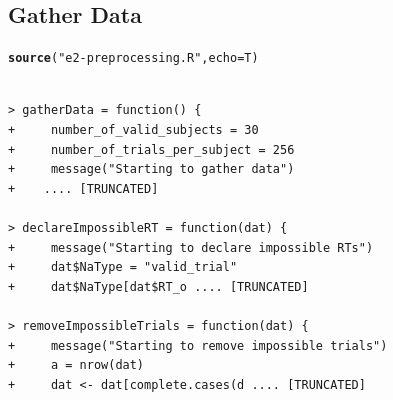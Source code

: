 \documentclass[a4paper,12pt,twoside]{article}\usepackage[]{graphicx}\usepackage[]{color}
\makeatletter
\newcommand{\hlstr}[1]{\textcolor[rgb]{0.192,0.494,0.8}{#1}}%
\newcommand{\hlstd}[1]{\textcolor[rgb]{0.345,0.345,0.345}{#1}}%
\newcommand{\hlkwc}[1]{\textcolor[rgb]{0.333,0.667,0.333}{#1}}%
\newcommand{\hlkwd}[1]{\textcolor[rgb]{0.737,0.353,0.396}{\textbf{#1}}}%
\newenvironment{kframe}{%
 \def\at@end@of@kframe{}%
 \ifinner\ifhmode%
  \def\at@end@of@kframe{\end{minipage}}%
  \begin{minipage}{\columnwidth}%
 \fi\fi%
 \def\FrameCommand##1{\hskip\@totalleftmargin \hskip-\fboxsep
 \colorbox{shadecolor}{##1}\hskip-\fboxsep
     \hskip-\linewidth \hskip-\@totalleftmargin \hskip\columnwidth}%
 \MakeFramed {\advance\hsize-\width
   \@totalleftmargin\z@ \linewidth\hsize
   \@setminipage}}%
 {\par\unskip\endMakeFramed%
 \at@end@of@kframe}
\newenvironment{knitrout}{}{} %
\makeatother
\begin{document}
\subsection{Gather Data}

\begin{knitrout}\scriptsize
{}\color{fgcolor}\begin{kframe}
\begin{alltt}
\hlkwd{source}\hlstd{(}\hlstr{"e2-preprocessing.R"}\hlstd{,} \hlkwc{echo} \hlstd{= T)}
\end{alltt}
\begin{verbatim}

> gatherData = function() {
+     number_of_valid_subjects = 30
+     number_of_trials_per_subject = 256
+     message("Starting to gather data")
+    .... [TRUNCATED] 

> declareImpossibleRT = function(dat) {
+     message("Starting to declare impossible RTs")
+     dat$NaType = "valid_trial"
+     dat$NaType[dat$RT_o .... [TRUNCATED] 

> removeImpossibleTrials = function(dat) {
+     message("Starting to remove impossible trials")
+     a = nrow(dat)
+     dat <- dat[complete.cases(d .... [TRUNCATED] 
\end{verbatim}
\end{kframe}
\end{knitrout}
\end{document}
